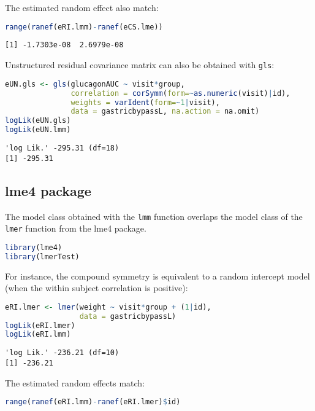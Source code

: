 \documentclass[12pt]{article}
\begin{document}
The estimated random effect also match:
\begin{lstlisting}[language=r,numbers=none]
range(ranef(eRI.lmm)-ranef(eCS.lme))
\end{lstlisting}

\label{}
\begin{verbatim}
[1] -1.7303e-08  2.6979e-08
\end{verbatim}


Unstructured residual covariance matrix can also be obtained with
\texttt{gls}:
\begin{lstlisting}[language=r,numbers=none]
eUN.gls <- gls(glucagonAUC ~ visit*group,
               correlation = corSymm(form=~as.numeric(visit)|id),
               weights = varIdent(form=~1|visit),
               data = gastricbypassL, na.action = na.omit)
logLik(eUN.gls)
logLik(eUN.lmm)
\end{lstlisting}

\label{}
\begin{verbatim}
'log Lik.' -295.31 (df=18)
[1] -295.31
\end{verbatim}


\clearpage
\subsection{lme4 package}
\label{sec:org97a6a6e}

The model class obtained with the \texttt{lmm} function overlaps the model
class of the \texttt{lmer} function from the lme4 package.
\begin{lstlisting}[language=r,numbers=none]
library(lme4)
library(lmerTest)
\end{lstlisting}

For instance, the compound symmetry is equivalent to a random
intercept model (when the within subject correlation is positive):
\begin{lstlisting}[language=r,numbers=none]
eRI.lmer <- lmer(weight ~ visit*group + (1|id),
                 data = gastricbypassL)
logLik(eRI.lmer)
logLik(eRI.lmm)
\end{lstlisting}

\label{}
\begin{verbatim}
'log Lik.' -236.21 (df=10)
[1] -236.21
\end{verbatim}


The estimated random effects match:
\begin{lstlisting}[language=r,numbers=none]
range(ranef(eRI.lmm)-ranef(eRI.lmer)$id)
\end{lstlisting}
\end{document}
